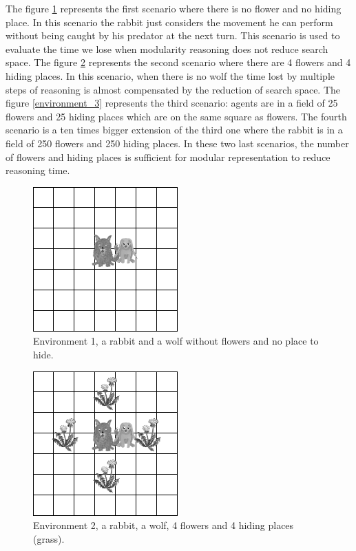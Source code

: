\documentclass{aamas2012}
\begin{document}
	The figure \ref{environment_1} represents the first scenario where there is no flower and no hiding place.
	In this scenario the rabbit just considers the movement he can perform without being caught by his predator at the next turn.
	This scenario is used to evaluate the time we lose when modularity reasoning does not reduce search space.
	The figure \ref{environment_2} represents the second scenario where there are 4 flowers and 4 hiding places.
	In this scenario, when there is no wolf the time lost by multiple steps of reasoning is almost compensated by the reduction of search space.
	The figure \ref{environment_3} represents the third scenario: agents are in a field of 25 flowers and 25 hiding places which are on the same square as flowers.
	The fourth scenario is a ten times bigger extension of the third one where the rabbit is in a field of 250 flowers and 250 hiding places. 
	In these two last scenarios, the number of flowers and hiding places is sufficient for modular representation to reduce reasoning time.
	
	\begin{figure}
		\centering
		\includegraphics[keepaspectratio=true, scale=0.5]{environment_1.png}
		\caption
		{
			\label{environment_1}
			Environment 1, a rabbit and a wolf without flowers and no place to hide.
		}
	\end{figure}

	\begin{figure}
		\centering
		\includegraphics[keepaspectratio=true, scale=0.5]{environment_2.png}
		\caption
		{
			\label{environment_2}
			Environment 2, a rabbit, a wolf, 4 flowers and 4 hiding places (grass).
		}
	\end{figure}
	
\end{document}
